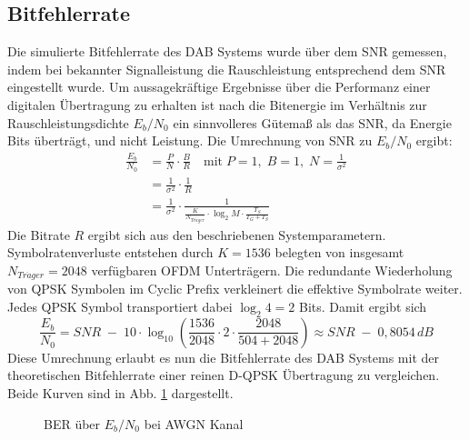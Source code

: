 \subsection{Bitfehlerrate}
Die simulierte Bitfehlerrate des DAB Systems wurde über dem SNR gemessen, indem bei bekannter Signalleistung die Rauschleistung entsprechend dem SNR eingestellt wurde. Um aussagekräftige Ergebnisse über die Performanz einer digitalen Übertragung zu erhalten ist nach \cite{snr:sklar2001digital} die Bitenergie im Verhältnis zur Rauschleistungsdichte $E_b/N_0$ ein sinnvolleres Gütemaß als das SNR, da Energie Bits überträgt, und nicht Leistung.
Die Umrechnung von SNR zu $E_b/N_0$ ergibt:
\begin{equation}
\begin{aligned}
\frac{E_b}{N_0} &= \frac{P}{N} \cdot \frac{B}{R} \quad \text{mit} \; P=1,\; B=1,\; N=\frac{1}{\sigma^2} \\
&= \frac{1}{\sigma^2} \cdot \frac{1}{R} \\
&= \frac{1}{\sigma^2} \cdot \frac{1}{\frac{K}{N_{Tr\ddot{a}ger}} \cdot \log_2 M \cdot \frac{T_S}{T_G+T_S}}
\end{aligned}
\end{equation}
Die Bitrate $R$ ergibt sich aus den beschriebenen Systemparametern. Symbolratenverluste entstehen durch $K=1536$ belegten von insgesamt $N_{Tr\ddot{a}ger}=2048$ verfügbaren OFDM Unterträgern. Die redundante Wiederholung von QPSK Symbolen im Cyclic Prefix verkleinert die effektive Symbolrate weiter. Jedes QPSK Symbol transportiert dabei $\log_2 4 = 2$ Bits. Damit ergibt sich
\begin{equation}
\frac{E_b}{N_0} = SNR \; - \; 10\cdot \log_{10} \left(\frac{1536}{2048} \cdot 2 \cdot \frac{2048}{504+2048} \right) \approx SNR \; - \; 0,8054\, dB
\end{equation}
Diese Umrechnung erlaubt es nun die Bitfehlerrate des DAB Systems mit der theoretischen Bitfehlerrate einer reinen D-QPSK Übertragung zu vergleichen. Beide Kurven sind in Abb. \ref{plot:awgn_ber} dargestellt.

\begin{figure}[htb]
\begin{center}
\end{center}
\caption{BER über $E_b/N_0$ bei AWGN Kanal}
\label{plot:awgn_ber}
\end{figure}

